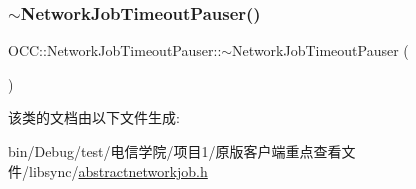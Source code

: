 \mbox{\label{class_o_c_c_1_1_network_job_timeout_pauser_a45af9a8694b9a3b7b459fe9ac69c44b3}} 
\subsubsection{\texorpdfstring{$\sim$\+Network\+Job\+Timeout\+Pauser()}{~NetworkJobTimeoutPauser()}}
{\footnotesize\ttfamily O\+C\+C\+::\+Network\+Job\+Timeout\+Pauser\+::$\sim$\+Network\+Job\+Timeout\+Pauser (\begin{DoxyParamCaption}{ }\end{DoxyParamCaption})}



该类的文档由以下文件生成\+:\begin{DoxyCompactItemize}
\item 
bin/\+Debug/test/电信学院/项目1/原版客户端重点查看文件/libsync/\hyperlink{abstractnetworkjob_8h}{abstractnetworkjob.\+h}\end{DoxyCompactItemize}
